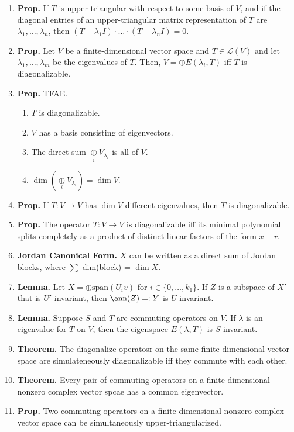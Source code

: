 \begin{enumerate}
	\item \textbf{Prop. } If $T$ is upper-triangular with respect to some basis of $V$, and if the diagonal entries of an upper-triangular matrix representation of $T$ are $\lambda_1,\dots,\lambda_n$, then $(T-\lambda_1I) \cdot \dots \cdot (T-\lambda_nI)=0$. 
	\item \textbf{Prop. } Let $V$ be a finite-dimensional vector space and $T \in \mathscr{L}(V)$ and let $\lambda_1,\dots,\lambda_m$ be the eigenvalues of $T$. Then, $V = \oplus E(\lambda_i, T)$ iff $T$ is diagonalizable. 
	\item \textbf{Prop. } TFAE. 
	\begin{enumerate}
		\item $T$ is diagonalizable. 
		\item $V$ has a basis consisting of eigenvectors. 
		\item The direct sum $\underset{i}{\oplus} V_{\lambda_i}$ is all of $V$. 
		\item $\dim \left(\underset{i}{\oplus} V_{\lambda_i} \right) = \dim V$. 
	\end{enumerate}
	\item \textbf{Prop. } If $T: V \to V$ has $\dim V$ different eigenvalues, then $T$ is diagonalizable. 
	\item \textbf{Prop. } The operator $T: V \to V$ is diagonalizable iff its minimal polynomial splits completely as a product of distinct linear factors of the form $x-r$. 
	\item \textbf{Jordan Canonical Form. } $X$ can be written as a direct sum of Jordan blocks, where $\sum$ dim(block) = $\dim X$. 
	\item \textbf{Lemma. } Let $X = \oplus \textrm{span}(U_iv)$ for $i \in \{0,\dots,k_1\}$. If $Z$ is a subspace of $X'$ that is $U'$-invariant, then $\ann(Z) =: Y$ is $U$-invariant. 
	\item \textbf{Lemma. } Suppose $S$ and $T$ are commuting operators on $V$. If $\lambda$ is an eigenvalue for $T$ on $V$, then the eigenspace $E(\lambda, T)$ is $S$-invariant. 
	\item \textbf{Theorem. } The diagonalize operatosr on the same finite-dimensional vector space are simulateneously diagonalizable iff they commute with each other. 
	\item \textbf{Theorem. } Every pair of commuting operators on a finite-dimensional nonzero complex vector spcae has a common eigenvector. 
	\item \textbf{Prop. } Two commuting operators on a finite-dimensional nonzero complex vector space can be simultaneously upper-triangularized. 

\end{enumerate}
